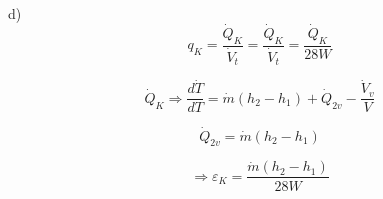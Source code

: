 d) \[ q_K = \frac{\dot{Q}_K}{\dot{V}_t} = \frac{\dot{Q}_K}{\dot{V}_t} = \frac{\dot{Q}_K}{28W} \]

\[
\dot{Q}_K \Rightarrow \frac{d\dot{T}}{dT} = \dot{m}(h_2 - h_1) + \dot{Q}_{2v} - \frac{\dot{V}_v}{V}
\]

\[
\dot{Q}_{2v} = \dot{m}(h_2 - h_1)
\]

\[
\Rightarrow \varepsilon_K = \frac{\dot{m}(h_2 - h_1)}{28W}
\]